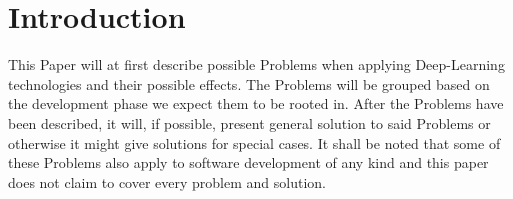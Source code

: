 \section{Introduction}

This Paper will at first describe possible Problems when applying Deep-Learning technologies and their possible effects. The Problems will be grouped based on the development phase we expect them to be rooted in. After the Problems have been described, it will, if possible, present general solution to said Problems or otherwise it might give solutions for special cases. It shall be noted that some of these Problems also apply to software development of any kind and this paper does not claim to cover every problem and solution.